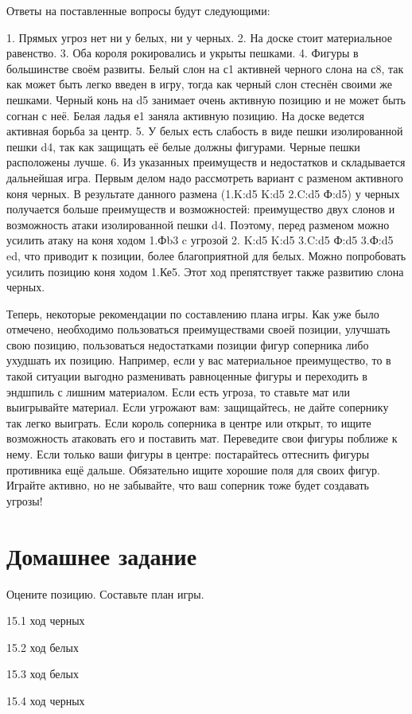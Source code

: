Ответы на поставленные вопросы будут следующими: 

1.	Прямых угроз нет ни у белых, ни у черных. 
2.	На доске стоит материальное равенство.
3.	Оба короля рокировались и укрыты пешками.
4.	Фигуры в большинстве своём развиты. Белый слон на с1 активней черного слона на с8, так как может быть легко введен в игру, тогда как черный слон стеснён своими же пешками. Черный конь на d5 занимает очень активную позицию и не может быть согнан с неё.  Белая ладья е1 заняла активную позицию. На доске ведется активная борьба за центр.
5.	У белых есть слабость в виде пешки изолированной пешки d4, так как защищать её белые должны фигурами. Черные пешки расположены лучше.
6.	Из указанных преимуществ и недостатков и складывается дальнейшая игра. Первым делом надо рассмотреть вариант с разменом активного коня черных. В результате данного размена (1.K:d5 K:d5 2.C:d5 Ф:d5) у черных получается больше преимуществ и возможностей: преимущество двух слонов и возможность атаки изолированной пешки d4. Поэтому, перед разменом можно усилить атаку на коня ходом 1.Фb3 c угрозой 2. K:d5 K:d5 3.C:d5 Ф:d5 3.Ф:d5 ed, что приводит к позиции, более благоприятной для белых. Можно попробовать усилить позицию коня ходом 1.Ке5. Этот ход препятствует также развитию слона черных.

Теперь, некоторые рекомендации по составлению плана игры. Как уже было отмечено, необходимо пользоваться преимуществами своей позиции, улучшать свою позицию, пользоваться недостатками позиции фигур соперника либо ухудшать их позицию. Например, если у вас материальное преимущество, то в такой ситуации выгодно разменивать равноценные фигуры и переходить в эндшпиль с лишним материалом. Если есть угроза, то ставьте мат или выигрывайте материал. Если угрожают вам: защищайтесь, не дайте сопернику так легко выиграть. Если король соперника в центре или открыт, то ищите возможность атаковать его и поставить мат. Переведите свои фигуры поближе к нему. Если только ваши фигуры в центре: постарайтесь оттеснить фигуры противника ещё дальше. Обязательно ищите хорошие поля для своих фигур. Играйте активно, но не забывайте, что ваш соперник тоже будет создавать угрозы!

\section{Домашнее задание}

Оцените позицию. Составьте план игры. 
 
15.1 ход черных
 
15.2 ход белых
 
 
15.3 ход белых
 
15.4 ход черных
 
